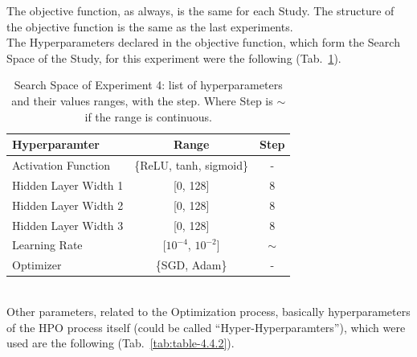 The objective function, as always, is the same for each Study. The structure of the objective function is the same as the last experiments.
% 
\\[0.3cm]The Hyperparameters declared in the objective function, which form the Search Space of the Study, for this experiment were the following (Tab.~\ref{tab:table-4.4.1}).
\begin{table}[ht!]
	\center
	\setlength{\tabcolsep}{0.5cm}
	\caption[Search Space of Experiment 4]{Search Space of Experiment 4: list of hyperparameters and their values ranges, with the step. Where Step is $\sim$ if the range is continuous.}
	\begin{tabular}{@{}lcc@{}}
		\toprule
		\textbf{Hyperparamter} & \textbf{Range}             & \textbf{Step} \\ \midrule
		Activation Function    & \{ReLU, tanh, sigmoid\}    & -             \\[0.1cm]
		Hidden Layer Width 1   & {[}0, 128{]}               & 8             \\[0.1cm]
		Hidden Layer Width 2   & {[}0, 128{]}               & 8             \\[0.1cm]
		Hidden Layer Width 3   & {[}0, 128{]}               & 8             \\[0.1cm]
		Learning Rate          & {[}$10^{-4}$, $10^{-2}${]} & $\sim$        \\[0.1cm]
		Optimizer              & \{SGD, Adam\}              & -             \\ \bottomrule
	\end{tabular}
	\label{tab:table-4.4.1}
\end{table}
% 
\\[0.3cm]Other parameters, related to the Optimization process, basically hyperparameters of the HPO process itself (could be called “Hyper-Hyperparamters”), which were used are the following (Tab.~\ref{tab:table-4.4.2}).
